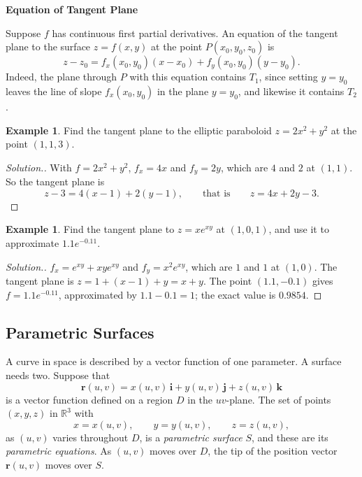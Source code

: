 \documentclass[11pt,a4paper]{article}
\theoremstyle{definition}
\newtheorem{exa}[thm]{Example}
\newenvironment{solution}
  {\renewcommand{\qedsymbol}{}\begin{proof}[\textit{Solution}.]}
  {\end{proof}}
\newcommand{\subhead}[1]{%
  \par\medskip\noindent\textbf{#1}\par\nobreak\smallskip}
\begin{document}
\subhead{Equation of Tangent Plane}

Suppose $f$ has continuous first partial derivatives. An equation of the tangent
plane to the surface $z = f(x,y)$ at the point $P(x_0, y_0, z_0)$ is
\[z -z_0 = f_x(x_0,y_0)(x-x_0) + f_y(x_0,y_0)(y-y_0) .\]
Indeed, the plane through $P$ with this equation contains $T_1$, since setting
$y = y_0$ leaves the line of slope $f_x(x_0,y_0)$ in the plane $y = y_0$, and
likewise it contains $T_2$.

\begin{exa}
\label{ex:tangentparaboloid}
Find the tangent plane to the elliptic paraboloid $z = 2x^2 + y^2$ at the point
$(1,1,3)$.
\end{exa}

\begin{solution}
With $f = 2x^2 + y^2$, $f_x = 4x$ and $f_y = 2y$, which are $4$ and $2$ at
$(1,1)$. So the tangent plane is
\[z - 3 = 4(x-1) + 2(y-1),\qquad\text{that is}\qquad z = 4x + 2y -3 .\]
\end{solution}

\begin{exa}
\label{ex:tangentexp}
Find the tangent plane to $z = xe^{xy}$ at $(1,0,1)$, and use it to approximate
$1.1e^{-0.11}$.
\end{exa}

\begin{solution}
$f_x = e^{xy} + xye^{xy}$ and $f_y = x^2e^{xy}$, which are $1$ and $1$ at
$(1,0)$. The tangent plane is $z = 1 + (x - 1) + y = x + y$. The point $(1.1,
-0.1)$ gives $f = 1.1e^{-0.11}$, approximated by $1.1 - 0.1 = 1$; the exact value
is $0.9854$.
\end{solution}

{\color[wave]{485}\subsection{Parametric Surfaces}}

A curve in space is described by a vector function of one parameter. A surface
needs two. Suppose that
\begin{equation}
\mathbf r(u,v) = x(u,v)\,\mathbf i + y(u,v)\,\mathbf j + z(u,v)\,\mathbf k
\label{eq:paramsurface}
\end{equation}
is a vector function defined on a region $D$ in the $uv$-plane. The set of
points $(x,y,z)$ in $\mathbb{R}^3$ with
\[x = x(u,v) ,\qquad  y = y(u,v) , \qquad  z = z(u,v) ,\]
as $(u,v)$ varies throughout $D$, is a \emph{parametric surface} $S$, and these
are its \emph{parametric equations}. As $(u,v)$ moves over $D$, the tip of the
position vector $\mathbf r(u,v)$ moves over $S$.
\end{document}
